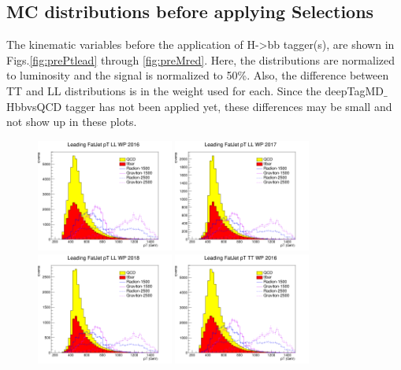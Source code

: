\subsection{MC distributions before applying Selections\label{ss:beforeDistbyYear}}
The kinematic variables before the application of H->bb tagger(s), are shown in Figs.\ref{fig:prePtlead} through \ref{fig:preMred}. Here, the distributions are normalized to luminosity and the signal is normalized to 50\%. Also, the difference between TT and LL distributions is in the weight used for each. Since the deepTagMD$\_$HbbvsQCD tagger has not been applied yet, these differences may be small and not show up in these plots.
\begin{figure}[!htb]
	\centering
	\includegraphics[width=0.4\textwidth]{Figures/pt0LL_16_deepTagMD_HbbvsQCD.png}
	\includegraphics[width=0.4\textwidth]{Figures/pt0LL_17_deepTagMD_HbbvsQCD.png}
	\includegraphics[width=0.4\textwidth]{Figures/pt0LL_18_deepTagMD_HbbvsQCD.png}
	\includegraphics[width=0.4\textwidth]{Figures/pt0TT_16_deepTagMD_HbbvsQCD.png}

\end{figure}
